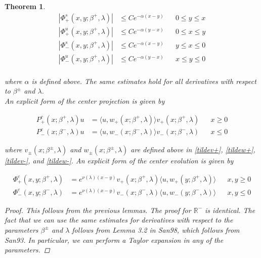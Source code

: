 \documentclass[12pt]{article}
\def\R{{\mathbb R}}
\newtheorem{theorem}{Theorem}
\begin{document}
\begin{theorem}
\begin{align*}
|\Phi^s_+(x, y; \beta^+, \lambda)| &\leq C e^{-\alpha(x - y)} && 0 \leq y \leq x \\
|\Phi^u_+(x, y; \beta^+, \lambda)| &\leq C e^{-\alpha(y - x)} && 0 \leq x \leq y \\
|\Phi^s_-(x, y; \beta^+, \lambda)| &\leq C e^{-\alpha(x - y)} && y \leq x \leq 0 \\
|\Phi^u_-(x, y; \beta^+, \lambda)| &\leq C e^{-\alpha(y - x)} && x \leq y \leq 0 \\
\end{align*}

where $\alpha$ is defined above. The same estimates hold for all derivatives with respect to $\beta^\pm$ and $\lambda$.\\

An explicit form of the center projection is given by

\begin{align}\label{Pc}
P^c_+(x; \beta^+, \lambda)u &= \langle u, w_+(x; \beta^+, \lambda) \rangle v_+(x; \beta^+, \lambda) && x \geq 0 \\
P^c_-(x; \beta^-, \lambda)u &= \langle u, w_-(x; \beta^-, \lambda) \rangle v_-(x; \beta^-, \lambda) && x \leq 0
\end{align}

where $v_\pm(x; \beta^\pm, \lambda)$ and $w_\pm(x; \beta^\pm, \lambda)$ are defined above in \eqref{tildev+}, \eqref{tildew+}, \eqref{tildev-}, and \eqref{tildew-}. An explicit form of the center evolution is given by

\begin{align}\label{Phic}
\Phi^c_+(x,y; \beta^+, \lambda) &= e^{\nu(\lambda)(x-y)} v_+(x; \beta^+, \lambda) \langle u, w_+(y; \beta^+, \lambda) \rangle && x, y \geq 0 \\
\Phi^c_-(x,y; \beta^-, \lambda) &= e^{\nu(\lambda)(x-y)} v_-(x; \beta^-, \lambda) \langle u, w_-(y; \beta^-, \lambda) \rangle && x, y \leq 0
\end{align}

\begin{proof}

This follows from the previous lemmas. The proof for $\R^-$ is identical. The fact that we can use the same estimates for derivatives with respect to the parameters $\beta^\pm$ and $\lambda$ follows from Lemma 3.2 in San98, which follows from San93. In particular, we can perform a Taylor expansion in any of the parameters.

\end{proof}
\end{theorem}
\end{document}

